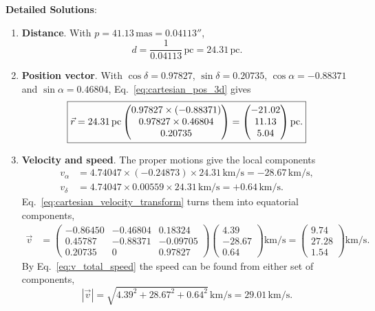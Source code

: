 \textbf{Detailed Solutions}:
\begin{enumerate}[label=(\alph*)]
	\item \textbf{Distance}. With $p = 41.13\,\mathrm{mas} = 0.04113''$,
	\[
	\boxed{d = \frac{1}{0.04113}\,\mathrm{pc} = 24.31\,\mathrm{pc}.}
	\]

	\item \textbf{Position vector}. With $\cos\delta=0.97827$, $\sin\delta=0.20735$, $\cos\alpha=-0.88371$ and $\sin\alpha=0.46804$, Eq.~\eqref{eq:cartesian_pos_3d} gives
	\[
	\boxed{\vec r = 24.31\,\mathrm{pc} \begin{pmatrix} 0.97827\times(-0.88371) \\ 0.97827\times0.46804 \\ 0.20735 \end{pmatrix}
	= \begin{pmatrix} -21.02 \\ 11.13 \\ 5.04 \end{pmatrix}\mathrm{pc}.}
	\]

	\item \textbf{Velocity and speed}. The proper motions give the local components
	\begin{align*}
		v_\alpha &= 4.74047 \times (-0.24873) \times 24.31\,\mathrm{km/s} = -28.67\,\mathrm{km/s}, \\
		v_\delta &= 4.74047 \times 0.00559 \times 24.31\,\mathrm{km/s} = +0.64\,\mathrm{km/s}.
	\end{align*}
	Eq.~\eqref{eq:cartesian_velocity_transform} turns them into equatorial components,
	\begin{align*}
		\vec v
		&= \begin{pmatrix} -0.86450 & -0.46804 & 0.18324 \\ 0.45787 & -0.88371 & -0.09705 \\ 0.20735 & 0 & 0.97827 \end{pmatrix}
		\begin{pmatrix} 4.39 \\ -28.67 \\ 0.64 \end{pmatrix}\mathrm{km/s}
		= \begin{pmatrix} 9.74 \\ 27.28 \\ 1.54 \end{pmatrix}\mathrm{km/s}.
	\end{align*}
	By Eq.~\eqref{eq:v_total_speed} the speed can be found from either set of components,
	\[
	\boxed{|\vec v| = \sqrt{4.39^2 + 28.67^2 + 0.64^2}\,\mathrm{km/s} = 29.01\,\mathrm{km/s}.}
	\]


\end{enumerate}
